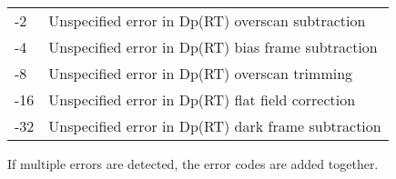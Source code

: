 \documentclass[10pt,a4paper]{article}
\begin{document}
\begin{tabular}{ll}
-2	&Unspecified error in Dp(RT) overscan subtraction\\
-4	&Unspecified error in Dp(RT) bias frame subtraction\\
-8	&Unspecified error in Dp(RT) overscan trimming \\
-16	&Unspecified error in Dp(RT) flat field correction\\
-32	&Unspecified error in Dp(RT) dark frame subtraction\\
\end{tabular}

If multiple errors are detected, the error codes are added together.
\end{document}
